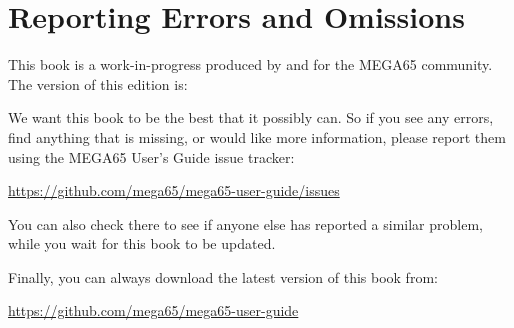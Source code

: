 \chapter*{Reporting Errors and Omissions}

This book is a work-in-progress produced by and for the MEGA65 community.
The version of this edition is:



We want this book to be the best that it possibly can. So if you see any errors,
find anything that is missing, or would like more information,
please report them using the MEGA65 User's Guide issue tracker:

\url{https://github.com/mega65/mega65-user-guide/issues}

You can also check there to see if anyone else has reported a similar problem,
while you wait for this book to be updated.

Finally, you can always download the latest version of this book from:

\url{https://github.com/mega65/mega65-user-guide}


